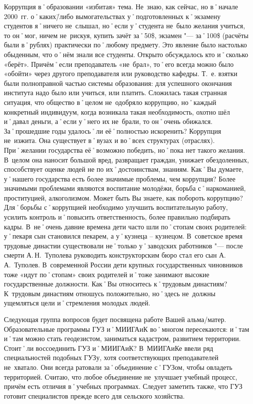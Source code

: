 \begin{drama}
	\pagebreak
	
	\maxspeaks Коррупция в˚образовании  «избитая» тема. Не~знаю, как сейчас, но в˚начале 2000~гг. о˚каких\=/либо вымогательствах у˚подготовленных к˚экзамену студентов я˚ничего не~слышал, но˚если у˚студента не~было желания учиться, то он˚мог, ничем не~рискуя, купить зачёт за˚50\$, экзамен "--- за˚100\$ (расчёты были в˚рублях) практически по˚любому предмету. Это явление было настолько обыденным, что о˚нём знали все студенты. Открыто обсуждалось кто и˚сколько  «берёт». Причём˚если преподаватель  «не~брал», то˚его всегда можно было  «обойти» через другого преподавателя или руководство кафедры. Т.~е. взятки были полноправной частью системы образования: для успешного окончания института надо было или учиться, или платить. Сложилась такая странная ситуация, что общество в˚целом не~одобряло коррупцию, но˚каждый конкретный индивидуум, когда возникала такая необходимость, охотно шёл и˚давал деньги, а˚если у˚него их не~брали, то он˚очень обижался. За˚прошедшие годы удалось˚ли её˚полностью искоренить?
	\michaelspeaks Коррупция не~изжита. Она существует в˚вузах и во˚всех структурах (отраслях). При˚желании государства её˚возможно победить, но˚пока нет такого желания. В~целом она наносит большой вред, развращает граждан, унижает обездоленных, способствует оценке людей не по их˚достоинствам, знаниям.
	\maxspeaks Как˚Вы думаете, у˚нашего государства есть более значимые проблемы, чем коррупция?
	\michaelspeaks Более значимыми проблемами являются воспитание молодёжи, борьба с˚наркоманией, проституцией, алкоголизмом.
	\maxspeaks Может быть Вы знаете, как побороть коррупцию? 
	\michaelspeaks Для˚борьбы с˚коррупцией необходимо улучшить воспитательную работу, усилить контроль и˚повысить ответственность, более правильно подбирать кадры.
	\maxspeaks В~не˚очень давние времена дети часто шли по˚стопам своих родителей: у˚пекаря сын становился пекарем, а у˚кузнеца – кузнецом. В~советское время трудовые династии существовали не˚только у˚заводских работников "--- после смерти А.\,Н.~Туполева руководить конструкторским бюро стал его сын А.\,А.~Туполев. В~современной России дети крупных государственных чиновников тоже «идут по˚стопам» своих родителей и˚тоже занимают высокие государственные должности. Как˚Вы относитесь к˚трудовым династиям?
	\michaelspeaks К~трудовым династиям отношусь положительно, но˚здесь не~должны ущемляться цели и˚стремления молодых людей.
	
	\maxspeaks Следующая группа вопросов будет посвящена работе Вашей альма\-/матер. Образовательные программы ГУЗ и˚МИИГАиК во˚многом пересекаются: и˚там и˚там можно стать геодезистом, заниматься кадастром, развитием территории. Стоит˚ли воссоединить ГУЗ и˚МИИГАиК? 
	\michaelspeaks В~МИИГАиКе ввели ряд специальностей подобных ГУЗу, хотя соответствующих преподавателей не~хватало. Они всегда ратовали за˚объединение с˚ГУЗом, чтобы овладеть территорией. Считаю, что любое объединение не~улучшает учебный процесс, причём есть отличия в˚учебных программах. Следует заметить также, что ГУЗ готовит специалистов прежде всего для сельского хозяйства.
	

\end{drama}
